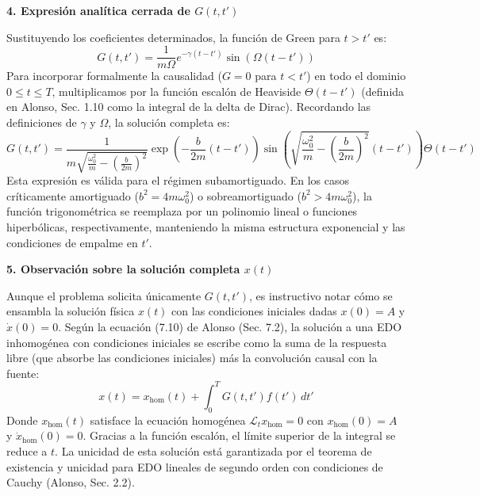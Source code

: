 \documentclass[a4paper]{article}
\begin{document}
\textbf{4. Expresión analítica cerrada de $G(t, t')$}

Sustituyendo los coeficientes determinados, la función de Green para $t > t'$ es:
$$ G(t, t') = \frac{1}{m\Omega} e^{-\gamma(t-t')} \sin\left( \Omega(t-t') \right) $$
Para incorporar formalmente la causalidad ($G=0$ para $t<t'$) en todo el dominio $0 \leq t \leq T$, multiplicamos por la función escalón de Heaviside $\Theta(t-t')$ (definida en Alonso, Sec. 1.10 como la integral de la delta de Dirac). Recordando las definiciones de $\gamma$ y $\Omega$, la solución completa es:
$$ G(t, t') = \frac{1}{m \sqrt{\frac{\omega_0^2}{m} - \left(\frac{b}{2m}\right)^2}} \exp\left( -\frac{b}{2m}(t-t') \right) \sin\left( \sqrt{\frac{\omega_0^2}{m} - \left(\frac{b}{2m}\right)^2} (t-t') \right) \Theta(t-t') $$
Esta expresión es válida para el régimen subamortiguado. En los casos críticamente amortiguado ($b^2=4m\omega_0^2$) o sobreamortiguado ($b^2>4m\omega_0^2$), la función trigonométrica se reemplaza por un polinomio lineal o funciones hiperbólicas, respectivamente, manteniendo la misma estructura exponencial y las condiciones de empalme en $t'$.

\textbf{5. Observación sobre la solución completa $x(t)$}

Aunque el problema solicita únicamente $G(t, t')$, es instructivo notar cómo se ensambla la solución física $x(t)$ con las condiciones iniciales dadas $x(0)=A$ y $\dot{x}(0)=0$. Según la ecuación (7.10) de Alonso (Sec. 7.2), la solución a una EDO inhomogénea con condiciones iniciales se escribe como la suma de la respuesta libre (que absorbe las condiciones iniciales) más la convolución causal con la fuente:
$$ x(t) = x_{\text{hom}}(t) + \int_0^T G(t, t') f(t') \, dt' $$
Donde $x_{\text{hom}}(t)$ satisface la ecuación homogénea $\mathscr{L}_t x_{\text{hom}} = 0$ con $x_{\text{hom}}(0)=A$ y $\dot{x}_{\text{hom}}(0)=0$. Gracias a la función escalón, el límite superior de la integral se reduce a $t$. La unicidad de esta solución está garantizada por el teorema de existencia y unicidad para EDO lineales de segundo orden con condiciones de Cauchy (Alonso, Sec. 2.2).




 
\end{document}
